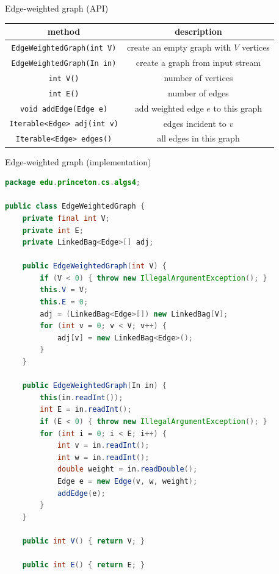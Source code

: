\documentclass[8pt,a4paper,compress]{beamer}
\begin{document}
\begin{frame}[fragile]
\pause

Edge-weighted graph (API)

\begin{center}
\begin{tabular}{cc}
method & description \\ \hline
\lstinline$EdgeWeightedGraph(int V)$ & create an empty graph with $V$ vertices \\
\lstinline$EdgeWeightedGraph(In in)$ & create a graph from input stream \\
\lstinline$int V()$ & number of vertices  \\
\lstinline$int E()$ & number of edges \\
\lstinline$void addEdge(Edge e)$ & add weighted edge $e$ to this graph \\
\lstinline$Iterable<Edge> adj(int v)$ & edges incident to $v$ \\
\lstinline$Iterable<Edge> edges()$ & all edges in this graph
\end{tabular}  
\end{center}
\end{frame}

\begin{frame}[fragile]
\pause

Edge-weighted graph (implementation)
\begin{lstlisting}[language=Java]
package edu.princeton.cs.algs4;

public class EdgeWeightedGraph {
    private final int V;
    private int E;
    private LinkedBag<Edge>[] adj;
    
    public EdgeWeightedGraph(int V) {
        if (V < 0) { throw new IllegalArgumentException(); }
        this.V = V;
        this.E = 0;
        adj = (LinkedBag<Edge>[]) new LinkedBag[V];
        for (int v = 0; v < V; v++) {
            adj[v] = new LinkedBag<Edge>();
        }
    }

    public EdgeWeightedGraph(In in) {
        this(in.readInt());
        int E = in.readInt();
        if (E < 0) { throw new IllegalArgumentException(); }
        for (int i = 0; i < E; i++) {
            int v = in.readInt();
            int w = in.readInt();
            double weight = in.readDouble();
            Edge e = new Edge(v, w, weight);
            addEdge(e);
        }
    }
    
    public int V() { return V; }

    public int E() { return E; }
\end{lstlisting}
\end{frame}
\end{document}
